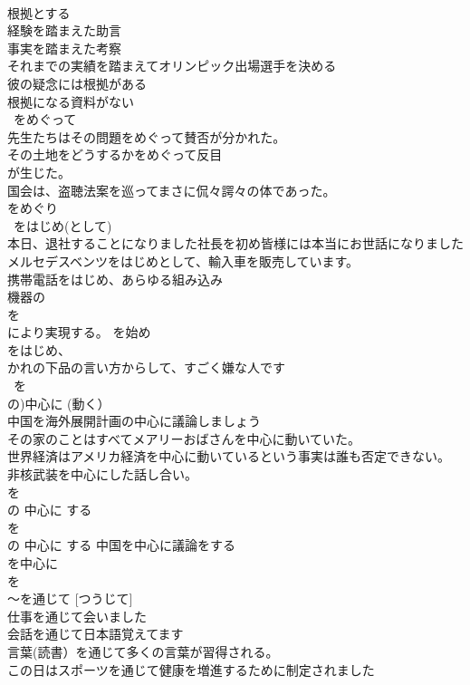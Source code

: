 \documentclass[8pt]{extreport}
\begin{document}
\begin{CJK}{UTF8}{min}
\\	根拠とする 
\\	経験を踏まえた助言 
\\	事実を踏まえた考察 
\\	それまでの実績を踏まえてオリンピック出場選手を決める 
\\	彼の疑念には根拠がある 
\\	根拠になる資料がない 
\\	~をめぐって	
\\	先生たちはその問題をめぐって賛否が分かれた。 
\\	その土地をどうするかをめぐって反目
\\	が生じた。 
\\	国会は、盗聴法案を巡ってまさに侃々諤々の体であった。 
\\	をめぐり 
\\	~をはじめ(として)	
\\	本日、退社することになりました社長を初め皆様には本当にお世話になりました メルセデスベンツをはじめとして、輸入車を販売しています。 
\\	携帯電話をはじめ、あらゆる組み込み
\\	機器の
\\	を
\\	により実現する。	を始め
\\	をはじめ、
\\	かれの下品の言い方からして、すごく嫌な人です 
\\	~を
\\	の)中心に (動く）	
\\	中国を海外展開計画の中心に議論しましょう 
\\	その家のことはすべてメアリーおばさんを中心に動いていた。 
\\	世界経済はアメリカ経済を中心に動いているという事実は誰も否定できない。 
\\	非核武装を中心にした話し合い。 
\\	を 
\\	の 中心に する 
\\	を 
\\	の 中心に する 中国を中心に議論をする 
\\	を中心に 
\\	を 
\\	～を通じて [つうじて]	
\\	仕事を通じて会いました 
\\	会話を通じて日本語覚えてます 
\\	言葉(読書）を通じて多くの言葉が習得される。 
\\	この日はスポーツを通じて健康を増進するために制定されました 

\end{CJK}
\end{document}
